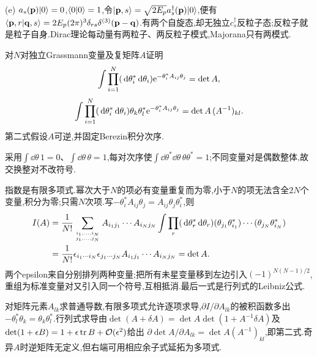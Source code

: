 \begin{solution}
(e) $a_s(\mathbf p)\lvert 0\rangle=0$,$\langle 0\vert 0\rangle=1$,令$\lvert \mathbf p,s\rangle=\sqrt{2E_p}a_s^\dagger(\mathbf p)\lvert 0\rangle$,便有
$\langle \mathbf p,r\vert \mathbf q,s\rangle=2E_p(2\pi)^3\delta_{rs}\delta^{(3)}(\mathbf p-\mathbf q)$.有两个自旋态,却无独立$c_s^\dagger$反粒子态;反粒子就是粒子自身.Dirac理论每动量有两粒子、两反粒子模式,Majorana只有两模式.
\end{solution}

\begin{exercise}
对$N$对独立Grassmann变量及复矩阵$A$证明
\[
 \int\prod_{i=1}^N(\,\mathrm d\theta_i^*\,\mathrm d\theta_i)\mathrm e^{-\theta_i^*A_{ij}\theta_j}=\det A,
\]
\[
 \int\prod_{i=1}^N(\,\mathrm d\theta_i^*\,\mathrm d\theta_i)\theta_k\theta_l^*\mathrm e^{-\theta_i^*A_{ij}\theta_j}
 =\det A\,(A^{-1})_{kl}.
\]
第二式假设$A$可逆,并固定Berezin积分次序.
\end{exercise}
\begin{solution}
采用$\int\dd\theta\,1=0$、$\int\dd\theta\,\theta=1$,每对次序使$\int\dd\theta^*\dd\theta\,\theta\theta^*=1$;不同变量对是偶数整体,故交换整对不改符号.

指数是有限多项式.幂次大于$N$的项必有变量重复而为零,小于$N$的项无法含全$2N$个变量,积分为零;只需$N$次项.写$-\theta_i^*A_{ij}\theta_j=A_{ij}\theta_j\theta_i^*$,则
\begin{align*}
 I(A)&=\frac1{N!}\sum_{i_1,\ldots,i_N\atop j_1,\ldots,j_N}
 A_{i_1j_1}\cdots A_{i_Nj_N}
 \int\prod_r(\,\mathrm d\theta_r^*\,\mathrm d\theta_r)
 (\theta_{j_1}\theta_{i_1}^*)\cdots(\theta_{j_N}\theta_{i_N}^*)\\
 &=\frac1{N!}\epsilon_{i_1\cdots i_N}\epsilon_{j_1\cdots j_N}
 A_{i_1j_1}\cdots A_{i_Nj_N}=\det A.
\end{align*}
两个epsilon来自分别排列两种变量;把所有未星变量移到左边引入$(-1)^{N(N-1)/2}$,重组为标准变量对又引入同一个符号,互相抵消.最后一式是行列式的Leibniz公式.

对矩阵元素$A_{lk}$求普通导数,有限多项式允许逐项求导,$\partial I/\partial A_{lk}$的被积函数多出$-\theta_l^*\theta_k=\theta_k\theta_l^*$.行列式求导由$\det(A+\delta A)=\det A\det(1+A^{-1}\delta A)$及$\det(1+\epsilon B)=1+\epsilon\operatorname{tr} B+\mathcal O(\epsilon^2)$给出
$\partial\det A/\partial A_{lk}=\det A(A^{-1})_{kl}$,即第二式.奇异$A$时逆矩阵无定义,但右端可用相应余子式延拓为多项式.
\end{solution}

